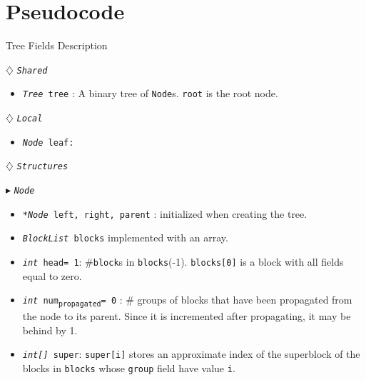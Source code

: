 \documentclass[10pt]{article}
\newcommand{\sub}[1]{\textsubscript{#1}}
\renewcommand{\tt}[1]{\texttt{#1}}
\renewcommand{\sl}[1]{\textsl{#1}}
\renewcommand{\bf}[1]{\textbf{#1}}
\newcommand{\head}{head}
\theoremstyle{definition}
\begin{document}
\section{Pseudocode}

\begin{algorithm}
\caption{Tree Fields Description}
\begin{algorithmic}[1]
\setcounter{ALG@line}{100}
\begin{multicols}{2}


\Statex $\diamondsuit$ \tt{\sl{Shared}}
\begin{itemize}
\item \tt{\sl{Tree} tree} \textsf{: A binary tree of \tt{Node}s. \tt{root} is the root node.}
\end{itemize}

\Statex

\Statex $\diamondsuit$ \tt{\sl{Local}}
\begin{itemize}
\item \tt{\sl{Node} leaf:} 
\end{itemize}

\Statex
\Statex $\diamondsuit$ \tt{\sl{Structures}}

\Statex $\blacktriangleright$ \tt{\sl{Node}}
\begin{itemize}
\item \tt{\sl{*Node} left, right, parent} \textsf{: initialized  when creating the tree.}
\item \tt{\sl{BlockList} blocks}
  \textsf{ implemented with an array.}
\item \tt{\sl{int} \head= 1}\textsf{: \#\tt{block}s in \tt{blocks}(-1). \tt{blocks[0]} is a block with all fields equal to zero.}
\item \tt{\sl{int} num\sub{propagated}= 0}\textsf{} \textsf{: \# groups of blocks that have been propagated from the node to its parent. Since it is incremented after propagating, it may be behind by 1.}
\item \tt{\sl{int[]} super}\textsf{: \tt{super[i]} stores an approximate index of the superblock of the blocks in \tt{blocks} whose \tt{group} field have value \tt{i}.}
\end{itemize}

%  
%
%  


\end{multicols}
\end{algorithmic}
\end{algorithm}
\end{document}
